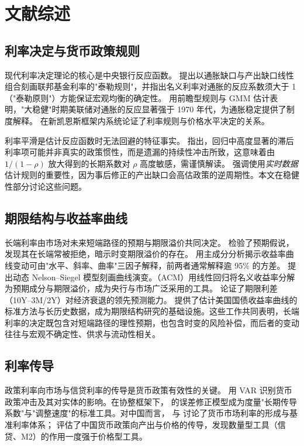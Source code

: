 \documentclass[12pt,a4paper]{ctexart}
\renewcommand{\citet}[1]{\citep{#1}}
\begin{document}
\section{文献综述}

\subsection{利率决定与货币政策规则}
现代利率决定理论的核心是中央银行反应函数。\citet{taylor1993} 提出以通胀缺口与产出缺口线性组合刻画联邦基金利率的"泰勒规则"，并指出名义利率对通胀的反应系数须大于 1（"泰勒原则"）方能保证宏观均衡的确定性。\citet{clarida2000} 用前瞻型规则与 GMM 估计表明，"大稳健"时期美联储对通胀的反应显著强于 1970 年代，为通胀稳定提供了制度解释。\citet{woodford2003} 在新凯恩斯框架内系统论证了利率规则与价格水平决定的关系。

利率平滑是估计反应函数时无法回避的特征事实。\citet{rudebusch2002} 指出，回归中高度显著的滞后利率项可能并非真实的政策惯性，而是遗漏的持续性冲击所致，这意味着由 $1/(1-\rho)$ 放大得到的长期系数对 $\rho$ 高度敏感，需谨慎解读。\citet{orphanides2001} 强调使用\emph{实时数据}估计规则的重要性，因为事后修正的产出缺口会高估政策的逆周期性。本文在稳健性部分讨论这些问题。

\subsection{期限结构与收益率曲线}
长端利率由市场对未来短端路径的预期与期限溢价共同决定。\citet{campbell1991} 检验了预期假说，发现其在长端常被拒绝，暗示时变期限溢价的存在。\citet{litterman1991} 用主成分分析揭示收益率曲线变动可由"水平、斜率、曲率"三因子解释，前两者通常解释逾 95\% 的方差。\citet{diebold2006} 提出动态 Nelson--Siegel 模型刻画曲线演变。\citet{adrian2013}（ACM）用线性回归将名义收益率分解为预期成分与期限溢价，成为央行与市场广泛采用的工具。\citet{estrella1998} 论证了期限利差（10Y--3M/2Y）对经济衰退的领先预测能力。\citet{gurkaynak2007} 提供了估计美国国债收益率曲线的标准方法与长历史数据，成为期限结构研究的基础设施。这些工作共同表明，长端利率的决定既包含对短端路径的理性预期，也包含时变的风险补偿，而后者的变动往往与宏观不确定性、供求与流动性相关。

\subsection{利率传导}
政策利率向市场与信贷利率的传导是货币政策有效性的关键。\citet{bernanke1992} 用 VAR 识别货币政策冲击及其对实体的影响。在协整框架下，\citet{engle1987} 的误差修正模型成为度量"长期传导系数"与"调整速度"的标准工具。对中国而言，\citet{he2012} 与 \citet{porter2010} 讨论了货币市场利率的形成与基准利率体系；\citet{fernald2014} 评估了中国货币政策向产出与价格的传导，发现数量型工具（信贷、M2）的作用一度强于价格型工具。
\end{document}
